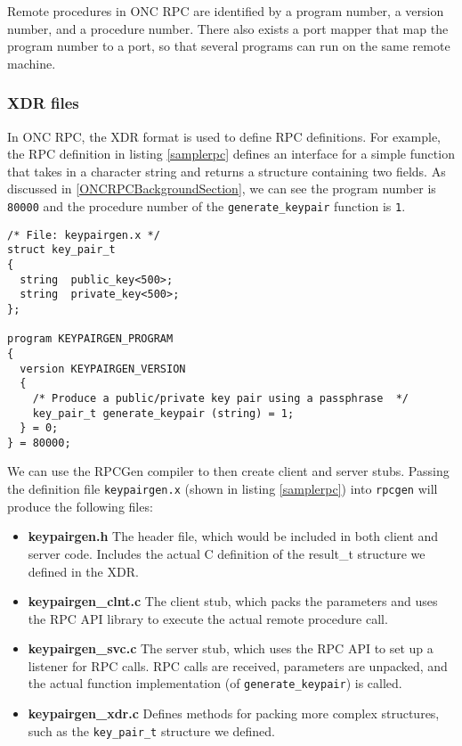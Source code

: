 Remote procedures in ONC RPC are identified by a program number, a version number, and a procedure number. There also exists a port mapper that map the program number to a port, so that several programs can run on the same remote machine. 

\subsubsection{XDR files}
\label{sec:xdrsyntax}
In ONC RPC, the XDR format is used to define RPC definitions. For example, the RPC definition in listing \ref{samplerpc} defines an interface for a simple function that takes in a character string  and returns a structure containing two fields. As discussed in \ref{ONCRPCBackgroundSection}, we can see the program number is \lstinline+80000+ and the procedure number of the \lstinline+generate_keypair+ function is \lstinline+1+.

\begin{lstlisting}
/* File: keypairgen.x */
struct key_pair_t
{
  string  public_key<500>;
  string  private_key<500>;
};

program KEYPAIRGEN_PROGRAM
{
  version KEYPAIRGEN_VERSION
  {
    /* Produce a public/private key pair using a passphrase  */
    key_pair_t generate_keypair (string) = 1;
  } = 0;
} = 80000;
\end{lstlisting}

We can use the RPCGen compiler to then create client and server stubs. Passing the definition file \verb+keypairgen.x+ (shown in listing \ref{samplerpc}) into \lstinline+rpcgen+ will produce the following files:

\begin{itemize}
	\item \textbf{keypairgen.h} The header file, which would be included in both client and server code. Includes the actual C definition of the result\_t structure we defined in the XDR.
	\item \textbf{keypairgen\_clnt.c} The client stub, which packs the parameters and uses the RPC API library to execute the actual remote procedure call.
	\item \textbf{keypairgen\_svc.c} The server stub, which uses the RPC API to set up a listener for RPC calls. RPC calls are received, parameters are unpacked, and the actual function implementation (of \lstinline+generate_keypair+) is called.
	\item \textbf{keypairgen\_xdr.c} Defines methods for packing more complex structures, such as the \lstinline+key_pair_t+ structure we defined.
\end{itemize}

